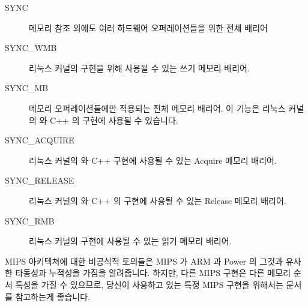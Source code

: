 \begin{description}
\item[SYNC]
	메모리 참조 외에도 여러 하드웨어 오퍼레이션들을 위한 전체 배리어

\item[SYNC\_WMB]
	리눅스 커널의  구현을 위해 사용될 수 있는 쓰기 메모리
	배리어.

\item[SYNC\_MB]
	메모리 오퍼레이션들에만 적용되는 전체 메모리 배리어.
	이 기능은 리눅스 커널의  와 C++
	 의 구현에 사용될 수
	있습니다.

\item[SYNC\_ACQUIRE]
	리눅스 커널의  와 C++
	 구현에 사용될 수
	있는 Acquire 메모리 배리어.

\item[SYNC\_RELEASE]
	리눅스 커널의  와 C++
	 의 구현에 사용될
	수 있는 Release 메모리 배리어.

\item[SYNC\_RMB]
	리눅스 커널의  구현에 사용될 수 있는 읽기 메모리 배리어.

\end{description}

MIPS 아키텍쳐에 대한 비공식적 토의들은 MIPS 가 ARM 과 Power 의 그것과 유사한
타동성과 누적성을 가짐을 알려줍니다.
하지만, 다른 MIPS 구현은 다른 메모리 순서 특성을 가질 수 있으므로, 당신이
사용하고 있는 특정 MIPS 구현을 위해서는 문서를 참고하는게 좋습니다.
\iffalse

